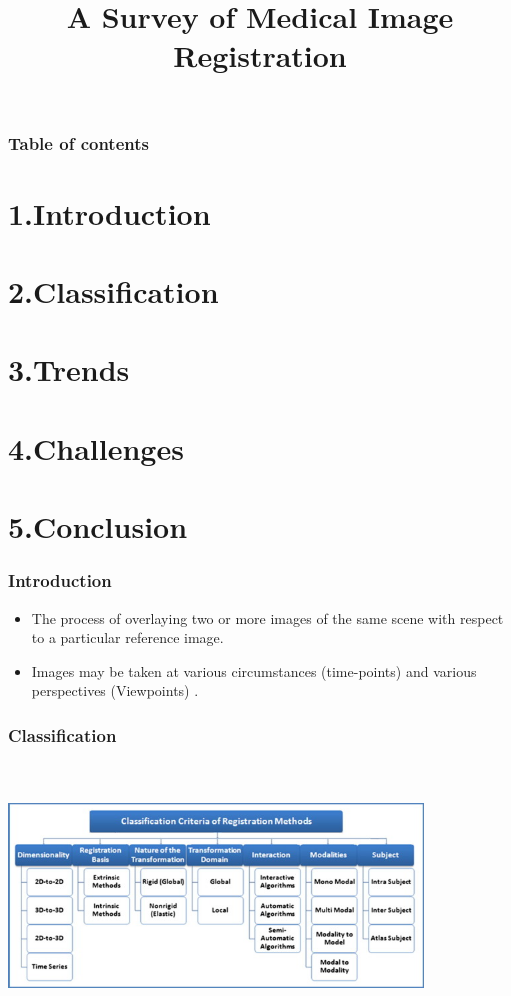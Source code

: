 \documentclass{beamer}
\title[Medical Image Registration]{A Survey of Medical Image Registration}
\author{} %
\institute[IIIT Vadodara] %
{
	\section{\vspace{-10ex}}
	\medskip
	\textbf{Presented By -} \\ %
	
	
	\text{Vijay Deshpande (201761003)}
	

}
\begin{document}
\begin{frame}
\titlepage %
\end{frame}

\begin{frame}
\frametitle{Table of contents} 
\tableofcontents
\section{1.Introduction} 
\section{2.Classification}
\section{3.Trends}
\section{4.Challenges}
\section{5.Conclusion}
\end{frame}


\begin{frame}
\frametitle{Introduction}
\begin{itemize}
	\item The process of overlaying two or more images of the same scene with respect to a particular reference image.\\
	\item Images may be taken at various circumstances
	(time-points) and various perspectives (Viewpoints) .\\
	
\end{itemize}

\end{frame}

\begin{frame}
\frametitle{Classification}
\includegraphics[width=11cm, height=7cm]{classi.png}
\end{frame}
\end{document}
